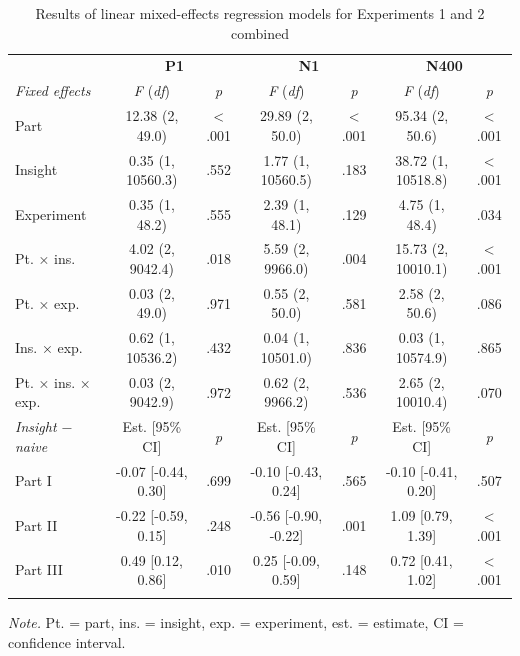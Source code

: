 \documentclass[
  english,
  man,11pt,floatsintext]{apa7}
\begin{document}
\begin{table}[tbp]

\begin{center}
\begin{threeparttable}

\caption{\label{tab:joint-table}Results of linear mixed-effects regression models for Experiments 1 and 2 combined}

\footnotesize{

\begin{tabular}{lcccccc}
\toprule
 & \multicolumn{2}{c}{\textbf{P1}} & \multicolumn{2}{c}{\textbf{N1}} & \multicolumn{2}{c}{\textbf{N400}} \\
\cmidrule(r){2-3} \cmidrule(r){4-5} \cmidrule(r){6-7}
\textit{Fixed effects} & \textit{F} (\textit{df}) & \textit{p} & \textit{F} (\textit{df}) & \textit{p} & \textit{F} (\textit{df}) & \textit{p}\\
\midrule
Part & 12.38 (2, 49.0) & < .001 & 29.89 (2, 50.0) & < .001 & 95.34 (2, 50.6) & < .001\\
Insight & 0.35 (1, 10560.3) & .552 & 1.77 (1, 10560.5) & .183 & 38.72 (1, 10518.8) & < .001\\
Experiment & 0.35 (1, 48.2) & .555 & 2.39 (1, 48.1) & .129 & 4.75 (1, 48.4) & .034\\
Pt. × ins. & 4.02 (2, 9042.4) & .018 & 5.59 (2, 9966.0) & .004 & 15.73 (2, 10010.1) & < .001\\
Pt. × exp. & 0.03 (2, 49.0) & .971 & 0.55 (2, 50.0) & .581 & 2.58 (2, 50.6) & .086\\
Ins. × exp. & 0.62 (1, 10536.2) & .432 & 0.04 (1, 10501.0) & .836 & 0.03 (1, 10574.9) & .865\\
Pt. × ins. × exp. & 0.03 (2, 9042.9) & .972 & 0.62 (2, 9966.2) & .536 & 2.65 (2, 10010.4) & .070\\
\textit{Insight $-$  naive} & Est. [95\% CI] & \textit{p} & Est. [95\% CI] & \textit{p} & Est. [95\% CI] & \textit{p}\\ \midrule
Part I & -0.07 [-0.44, 0.30] & .699 & -0.10 [-0.43, 0.24] & .565 & -0.10 [-0.41, 0.20] & .507\\
Part II & -0.22 [-0.59, 0.15] & .248 & -0.56 [-0.90, -0.22] & .001 & 1.09 [0.79, 1.39] & < .001\\
Part III & 0.49 [0.12, 0.86] & .010 & 0.25 [-0.09, 0.59] & .148 & 0.72 [0.41, 1.02] & < .001\\
\bottomrule
\addlinespace
\end{tabular}

}

\begin{tablenotes}[para]
\normalsize{\textit{Note.} Pt. = part, ins. = insight, exp. = experiment, est. = estimate, CI = confidence interval.}
\end{tablenotes}

\end{threeparttable}
\end{center}

\end{table}
\end{document}
